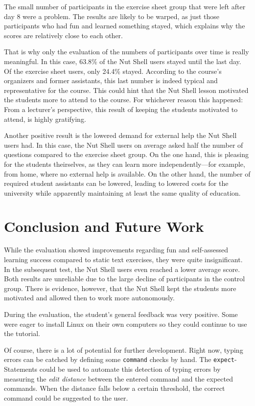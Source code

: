 \documentclass[paper=a4,twoside,abstract=on,cleardoublepage=empty,numbers=noenddot,toc=bib,12pt,appendixprefix=true]{scrreprt}
\begin{document}
The small number of participants in the exercise sheet group that were left after day 8 were a problem. The results are likely to be warped, as just those participants who had fun and learned something stayed, which explains why the scores are relatively close to each other.

That is why only the evaluation of the numbers of participants over time is really meaningful. In this case, 63.8\% of the Nut Shell users stayed until the last day. Of the exercise sheet users, only 24.4\% stayed. According to the course's organizers and former assistants, this last number is indeed typical and representative for the course. This could hint that the Nut Shell lesson motivated the students more to attend to the course. For whichever reason this happened: From a lecturer's perspective, this result of keeping the students motivated to attend, is highly gratifying.

Another positive result is the lowered demand for external help the Nut Shell users had. In this case, the Nut Shell users on average asked half the number of questions compared to the exercise sheet group. On the one hand, this is pleasing for the students theirselves, as they can learn more independently---for example, from home, where no external help is available. On the other hand, the number of required student assistants can be lowered, leading to lowered costs for the university while apparently maintaining at least the same quality of education.

\chapter{Conclusion and Future Work}

While the evaluation showed improvements regarding fun and self-assessed learning success compared to static text exercises, they were quite insignificant. In the subsequent test, the Nut Shell users even reached a lower average score. Both results are unreliable due to the large decline of participants in the control group. There is evidence, however, that the Nut Shell kept the students more motivated and allowed then to work more autonomously.

During the evaluation, the student's general feedback was very positive. Some were eager to install Linux on their own computers so they could continue to use the tutorial.

Of course, there is a lot of potential for further development. Right now, typing errors can be catched by defining some \texttt{command} checks by hand. The \texttt{expect}-Statements could be used to automate this detection of typing errors by measuring the \emph{edit distance}  between the entered command and the expected commands. When the distance falls below a certain threshold, the correct command could be suggested to the user.
\end{document}
